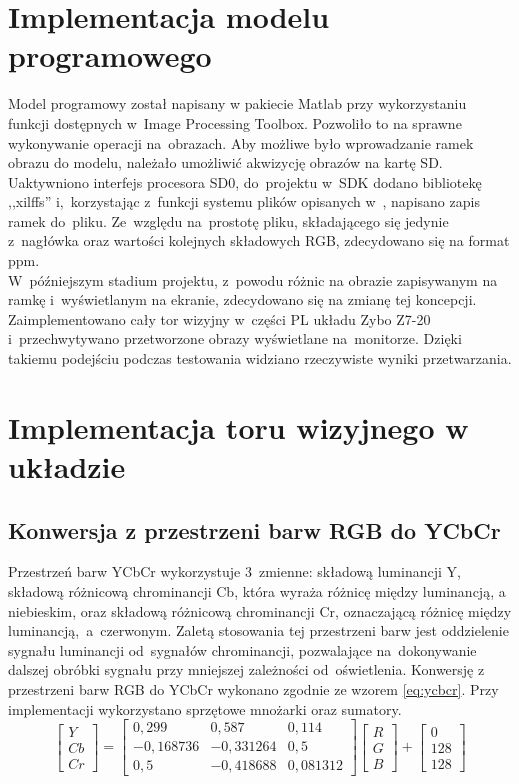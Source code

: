 \section{Implementacja modelu programowego}
\label{sec:Implementacja modelu programowego}
Model programowy został napisany w pakiecie Matlab przy wykorzystaniu funkcji dostępnych w~Image Processing Toolbox. Pozwoliło to na sprawne wykonywanie operacji na~obrazach.
Aby możliwe było wprowadzanie ramek obrazu do modelu, należało umożliwić akwizycję obrazów na kartę SD. Uaktywniono interfejs procesora SD0, do~projektu w~SDK dodano bibliotekę ,,xilffs'' i,~korzystając z~funkcji systemu plików opisanych w~\cite{xilffs}, napisano zapis ramek do~pliku. Ze~względu na~prostotę pliku, składającego się jedynie z~nagłówka oraz wartości kolejnych składowych RGB, zdecydowano się na format ppm.\\
W~późniejszym stadium projektu, z~powodu różnic na obrazie zapisywanym na ramkę i~wyświetlanym na ekranie, zdecydowano się na zmianę tej koncepcji. Zaimplementowano cały tor wizyjny w~części PL układu Zybo Z7-20 i~przechwytywano przetworzone obrazy wyświetlane na~monitorze. Dzięki takiemu podejściu podczas testowania widziano rzeczywiste wyniki przetwarzania.
\section{Implementacja toru wizyjnego w układzie}
\label{sec:Implementacja toru wizyjnego w układzie}
\subsection{Konwersja z przestrzeni barw RGB do YCbCr}
\label{subsec:konwersja}
Przestrzeń barw YCbCr wykorzystuje 3~zmienne: składową luminancji Y, składową różnicową chrominancji Cb, która wyraża różnicę między luminancją, a niebieskim, oraz składową różnicową chrominancji Cr, oznaczającą różnicę między luminancją,~a~czerwonym. Zaletą stosowania tej przestrzeni barw jest oddzielenie sygnału luminancji od~sygnałów chrominancji, pozwalające na~dokonywanie dalszej obróbki sygnału przy mniejszej zależności od~oświetlenia.
Konwersję z przestrzeni barw RGB do YCbCr wykonano zgodnie ze wzorem \ref{eq:ycbcr}. Przy implementacji wykorzystano sprzętowe mnożarki oraz sumatory.
\begin{equation}
\label{eq:ycbcr}
\begin{bmatrix} Y \\ 
				Cb\\
				Cr
\end{bmatrix}=
\begin{bmatrix} 0,299 & 0,587 & 0,114\\ 
				-0,168736 & -0,331264 & 0,5\\
				0,5 & -0,418688 & 0,081312
\end{bmatrix}
\begin{bmatrix} R\\
				G\\
				B
\end{bmatrix}+
\begin{bmatrix} 0\\
				128\\
				128
\end{bmatrix}
\end{equation}
